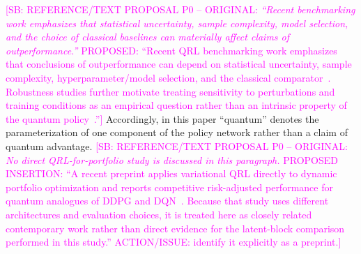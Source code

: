 \documentclass[aps,floatfix,superscriptaddress,twocolumn,tightenlines,amsmath,amssymb,nofootinbib,10pt,longbibliography,prl]{revtex4-2}
\newcommand{\sam}[1]{\textcolor{magenta}{[SB: {#1}]}}
\begin{document}
\sam{REFERENCE/TEXT PROPOSAL P0 -- ORIGINAL: \textit{``Recent benchmarking work emphasizes that statistical uncertainty, sample complexity, model selection, and the choice of classical baselines can materially affect claims of outperformance.''} PROPOSED: ``Recent QRL benchmarking work emphasizes that conclusions of outperformance can depend on statistical uncertainty, sample complexity, hyperparameter/model selection, and the classical comparator~\cite{Meyer2025BenchmarkingQuantumR,Kruse2025BenchmarkingQuantumRL}. Robustness studies further motivate treating sensitivity to perturbations and training conditions as an empirical question rather than an intrinsic property of the quantum policy~\cite{Skolik2023Robustnessofquantumr}.''} Accordingly, in this paper ``quantum'' denotes the parameterization of one component of the policy network rather than a claim of quantum advantage.
\sam{REFERENCE/TEXT PROPOSAL P0 -- ORIGINAL: \textit{No direct QRL-for-portfolio study is discussed in this paragraph.} PROPOSED INSERTION: ``A recent preprint applies variational QRL directly to dynamic portfolio optimization and reports competitive risk-adjusted performance for quantum analogues of DDPG and DQN~\cite{Gurgul2026QRLPortfolio}. Because that study uses different architectures and evaluation choices, it is treated here as closely related contemporary work rather than direct evidence for the latent-block comparison performed in this study.'' ACTION/ISSUE: identify it explicitly as a preprint.}
\end{document}
